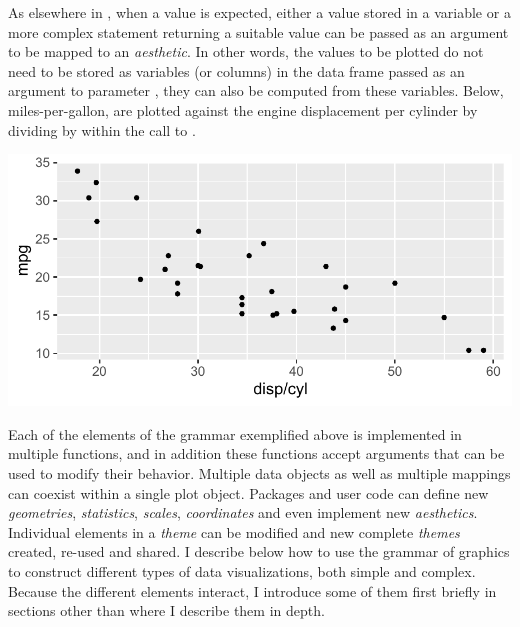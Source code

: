 \documentclass[krantz2]{krantz}\usepackage{knitr}
\begin{document}
As elsewhere in \Rlang, when a value is expected, either a value stored in a variable or a more complex statement returning a suitable value can be passed as an argument to be mapped to an \emph{aesthetic}. In other words, the values to be plotted do not need to be stored as variables (or columns) in the data frame passed as an argument to parameter , they can also be computed from these variables. Below, miles-per-gallon,  are plotted against the engine displacement per cylinder by dividing  by  within the call to .

\begin{knitrout}\footnotesize
{}\color{fgcolor}\begin{kframe}
\begin{alltt}
\hlstd{(} 
        \hlstd{=} \hlstd{(}  \hlopt{/}    \hlopt{+}
  \hlstd{()}
\end{alltt}
\end{kframe}

{\centering \includegraphics[width=.7\textwidth]{figure/pos-ggplot-basics-info-01-1} 

}


\end{knitrout}

Each of the elements of the grammar exemplified above is implemented in multiple functions, and in addition these functions accept arguments that can be used to modify their behavior. Multiple data objects as well as multiple mappings can coexist within a single  plot object. Packages and user code can define new \emph{geometries}, \emph{statistics}, \emph{scales}, \emph{coordinates} and even implement new \emph{aesthetics}. Individual elements in a \emph{theme} can be modified and new complete \emph{themes} created, re-used and shared. I describe below how to use the grammar of graphics to construct different types of data visualizations, both simple and complex. Because the different elements interact, I introduce some of them first briefly in sections other than where I describe them in depth.
\end{document}
